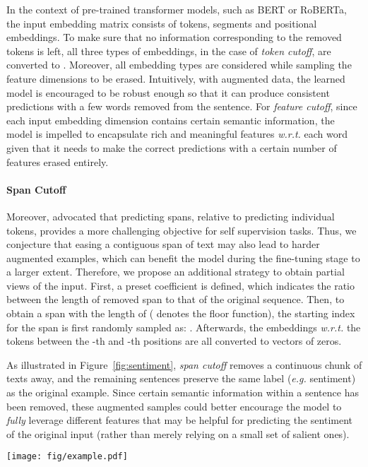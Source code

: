 \documentclass[11pt,a4paper]{article}
\begin{document}
In the context of pre-trained transformer models, such as BERT or RoBERTa, the input embedding matrix consists of tokens, segments and positional embeddings. To make sure that no information corresponding to the removed tokens is left, all three types of embeddings, in the case of \emph{token cutoff}, are converted to . Moreover, all embedding types are considered while sampling the feature dimensions to be erased.  
Intuitively, with augmented data, the learned model is encouraged to be robust enough so that it can produce consistent predictions with a few words removed from the sentence. 
For \emph{feature cutoff}, since each input embedding dimension contains certain semantic information, the model is impelled to encapsulate rich and meaningful features \emph{w.r.t.} each word given that it needs to make the correct predictions with a certain number of features erased entirely.
\vspace{-2mm}
\paragraph{Span Cutoff} Moreover, \cite{joshi2019spanbert} advocated that predicting spans, relative to predicting individual tokens, provides a more challenging objective for self supervision tasks. Thus, we conjecture that easing a contiguous span of text may also lead to harder augmented examples, which can benefit the model during the fine-tuning stage to a larger extent. Therefore, we propose an additional strategy to obtain partial views of the input. First, a preset coefficient  is defined, which indicates the ratio between the length of removed span to that of the original sequence.
Then, to obtain a span with the length of  ( denotes the floor function), the starting index  for the span is first randomly sampled as: . Afterwards, the embeddings \emph{w.r.t.} the tokens between the -th and -th positions are all converted to vectors of zeros.

As illustrated in Figure~\ref{fig:sentiment}, \emph{span cutoff} removes a continuous chunk of texts away, and the remaining sentences preserve the same label (\emph{e.g.} sentiment) as the original example. 
Since certain semantic information within a sentence has been removed, these augmented samples could better encourage the model to \emph{fully} leverage different features that may be helpful for predicting the sentiment of the original input (rather than merely relying on a small set of salient ones).
\begin{figure*}
	\centering
	\texttt{[image: fig/example.pdf]} 
	\vspace{-6mm}
	\caption{Illustration of the proposed span cutoff method with one specific example (from the SST-2 dataset). In this case, the model is supposed to produce consistent predictions (\emph{i.e.}, sentiments) for all three augmented samples (with various spans of tokens removed).}
	\label{fig:sentiment}
	\vspace{-4mm}
\end{figure*}
\end{document}
